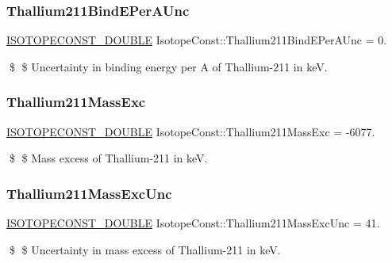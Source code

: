 \subsubsection{\texorpdfstring{Thallium211\+Bind\+E\+Per\+A\+Unc}{Thallium211BindEPerAUnc}}
{\footnotesize\ttfamily \mbox{\hyperlink{group___isotope_const-_macros_ga8f45a7272ce02c0b4c65c44636ed719a}{I\+S\+O\+T\+O\+P\+E\+C\+O\+N\+S\+T\+\_\+\+D\+O\+U\+B\+LE}} Isotope\+Const\+::\+Thallium211\+Bind\+E\+Per\+A\+Unc = 0.}

\$ \$ Uncertainty in binding energy per A of Thallium-\/211 in keV. \mbox{\label{group___isotope_const-_thallium-_tl211_ga90d46d9542a5bafa2eaf40fc0520e133}} 
\subsubsection{\texorpdfstring{Thallium211\+Mass\+Exc}{Thallium211MassExc}}
{\footnotesize\ttfamily \mbox{\hyperlink{group___isotope_const-_macros_ga8f45a7272ce02c0b4c65c44636ed719a}{I\+S\+O\+T\+O\+P\+E\+C\+O\+N\+S\+T\+\_\+\+D\+O\+U\+B\+LE}} Isotope\+Const\+::\+Thallium211\+Mass\+Exc = -\/6077.}

\$ \$ Mass excess of Thallium-\/211 in keV. \mbox{\label{group___isotope_const-_thallium-_tl211_ga7c68da85676035ab3d38825f905bd84c}} 
\subsubsection{\texorpdfstring{Thallium211\+Mass\+Exc\+Unc}{Thallium211MassExcUnc}}
{\footnotesize\ttfamily \mbox{\hyperlink{group___isotope_const-_macros_ga8f45a7272ce02c0b4c65c44636ed719a}{I\+S\+O\+T\+O\+P\+E\+C\+O\+N\+S\+T\+\_\+\+D\+O\+U\+B\+LE}} Isotope\+Const\+::\+Thallium211\+Mass\+Exc\+Unc = 41.}

\$ \$ Uncertainty in mass excess of Thallium-\/211 in keV. \mbox{\label{group___isotope_const-_thallium-_tl211_ga4eee849355ad753fe20bf2c085fe77a4}} 
